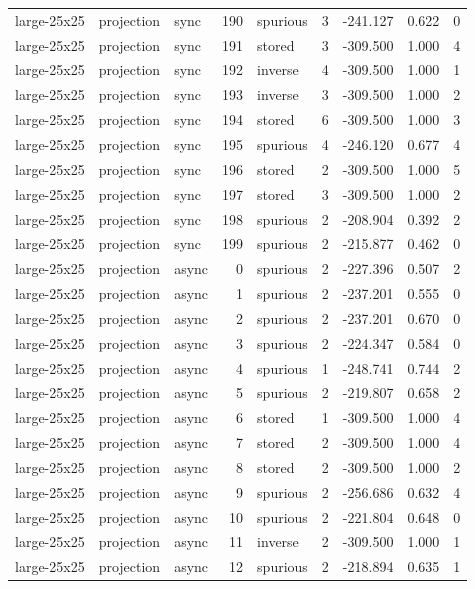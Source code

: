 \begin{tabular}{lllrlrrrr}
large-25x25 & projection & sync & 190 & spurious & 3 & -241.127 & 0.622 & 0 \\
large-25x25 & projection & sync & 191 & stored & 3 & -309.500 & 1.000 & 4 \\
large-25x25 & projection & sync & 192 & inverse & 4 & -309.500 & 1.000 & 1 \\
large-25x25 & projection & sync & 193 & inverse & 3 & -309.500 & 1.000 & 2 \\
large-25x25 & projection & sync & 194 & stored & 6 & -309.500 & 1.000 & 3 \\
large-25x25 & projection & sync & 195 & spurious & 4 & -246.120 & 0.677 & 4 \\
large-25x25 & projection & sync & 196 & stored & 2 & -309.500 & 1.000 & 5 \\
large-25x25 & projection & sync & 197 & stored & 3 & -309.500 & 1.000 & 2 \\
large-25x25 & projection & sync & 198 & spurious & 2 & -208.904 & 0.392 & 2 \\
large-25x25 & projection & sync & 199 & spurious & 2 & -215.877 & 0.462 & 0 \\
large-25x25 & projection & async & 0 & spurious & 2 & -227.396 & 0.507 & 2 \\
large-25x25 & projection & async & 1 & spurious & 2 & -237.201 & 0.555 & 0 \\
large-25x25 & projection & async & 2 & spurious & 2 & -237.201 & 0.670 & 0 \\
large-25x25 & projection & async & 3 & spurious & 2 & -224.347 & 0.584 & 0 \\
large-25x25 & projection & async & 4 & spurious & 1 & -248.741 & 0.744 & 2 \\
large-25x25 & projection & async & 5 & spurious & 2 & -219.807 & 0.658 & 2 \\
large-25x25 & projection & async & 6 & stored & 1 & -309.500 & 1.000 & 4 \\
large-25x25 & projection & async & 7 & stored & 2 & -309.500 & 1.000 & 4 \\
large-25x25 & projection & async & 8 & stored & 2 & -309.500 & 1.000 & 2 \\
large-25x25 & projection & async & 9 & spurious & 2 & -256.686 & 0.632 & 4 \\
large-25x25 & projection & async & 10 & spurious & 2 & -221.804 & 0.648 & 0 \\
large-25x25 & projection & async & 11 & inverse & 2 & -309.500 & 1.000 & 1 \\
large-25x25 & projection & async & 12 & spurious & 2 & -218.894 & 0.635 & 1 \\

\end{tabular}
